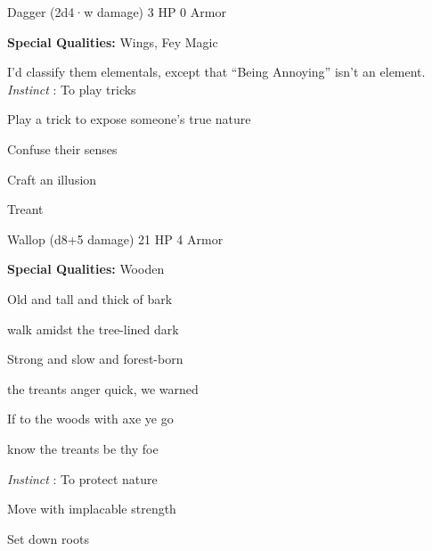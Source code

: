 Dagger (2d4·w damage)	3 HP	0 Armor

       


       
\startMonsterQualities
         {\bf Special Qualities:}  Wings, Fey Magic
\stopMonsterQualities
       
\startMonsterDescription
I’d classify them elementals, except that “Being Annoying” isn’t an element. {\em Instinct} : To play tricks
\stopMonsterDescription
       
\startitemize[1,packed]
         
\item Play a trick to expose someone's true nature

         
\item Confuse their senses

         
\item Craft an illusion

       
\stopitemize
       
\startMonsterName
Treant	 
\stopMonsterName
       

Wallop (d8+5 damage)	21 HP	4 Armor

       


       
\startMonsterQualities
         {\bf Special Qualities:}  Wooden
\stopMonsterQualities
       
\startMonsterDescription
Old and tall and thick of bark
\stopMonsterDescription
       

walk amidst the tree-lined dark

       

Strong and slow and forest-born

       

the treants anger quick, we warned

       

If to the woods with axe ye go

       

know the treants be thy foe

       

         {\em Instinct} : To protect nature

       
\startitemize[1,packed]
         
\item Move with implacable strength

         
\item Set down roots

